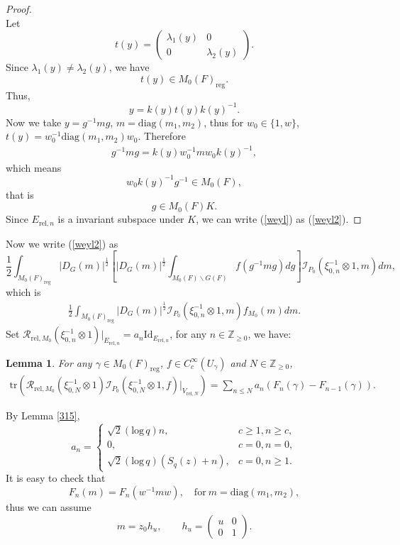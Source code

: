 \documentclass[11pt]{amsart}
\newtheorem {lemma}      [theorem]    {Lemma}
\renewcommand{\rm}{\mathrm}
\theoremstyle{definition}
\numberwithin{equation}{section}
\begin{document}
\begin{proof}
\[		\]
		Let
		\[
		t(y) = \begin{pmatrix} \lambda_1(y) & 0 \\ 0 & \lambda_2(y) \end{pmatrix}.
		\]
		Since \(\lambda_1(y) \neq \lambda_2(y)\), we have
		\[
		t(y) \in M_0(F)_{\mathrm{reg}}.
		\]
		Thus,
		\[
		y = k(y) t(y) k(y)^{-1}.
		\]
		Now we take \(y=g^{-1}mg\), \(m=\rm{diag}(m_1,m_2)\), thus for \(w_0\in \{1,w\}\), \(t(y)=w_0^{-1}\rm{diag}(m_1,m_2)w_0\). Therefore 
		\begin{align*}
			g^{-1}mg=k(y)w_0^{-1}mw_0k(y)^{-1},
		\end{align*}
		which means \[w_0k(y)^{-1}g^{-1}\in M_0(F),\]that is \[g\in M_0(F)K.\]
		Since \(E_{\rm{rel},n}\) is a invariant subspace under \(K\), we can write (\ref{weyl}) as (\ref{weyl2}).
	\end{proof}
	Now we write (\ref{weyl2}) as 
	\[\frac{1}{2}\int_{M_0(F)_{\rm{reg}}}|D_G(m)|^{\frac{1}{2}}\left[|D_G(m)|^{\frac{1}{2}}\int_{M_0(F)\backslash G(F)}f(g^{-1}mg)dg \right]\mathscr{I}_{P_0}(\xi_{0,n}^{-1}\otimes 1,m) dm,\]which is 
	\begin{align}\label{inverse}
		\frac{1}{2}\int_{M_0(F)_{\rm{reg}}}|D_G(m)|^{\frac{1}{2}}\mathscr{I}_{P_0}(\xi_{0,n}^{-1}\otimes 1,m) f_{M_0}(m)dm.
	\end{align}
	Set \(\mathscr{R}_{\rm{rel},M_0}(\xi_{0,n}^{-1}\otimes 1)|_{E_{\rm{rel},n}}=a_n \rm{Id}_{E_{\rm{rel},n}}\), for any \(n\in\mathbb{Z}_{\ge0}\), we have:
	\begin{lemma}\label{318}
		For any \(\gamma\in M_0(F)_{\rm{reg}}\), \(f\in C_c^\infty(U_\gamma)\) and \(N\in\mathbb{Z}_{\ge0}\),
		\begin{align*}
			\rm{tr} ( \mathscr{R}_{\rm{rel},M_0}(\xi_{0,N}^{-1}\otimes 1) \mathscr{I}_{P_0}(\xi_{0,N}^{-1}\otimes 1,f)|_{V_{\rm{rel},N}} )=\sum_{n\le N}a_n(F_n(\gamma)-F_{n-1}(\gamma)).
		\end{align*}
	\end{lemma}
	By Lemma \ref{315}, \[a_n = \begin{cases}
		\sqrt{2}(\rm{log}\,q) n, & c \ge 1, n \ge c, \\
		0, & c = 0, n = 0, \\
		\sqrt{2}(\rm{log}\,q) \left( S_q(z) + n \right), & c = 0, n \ge 1.
	\end{cases}\]
	It is easy to check that \[F_n(m)=F_n(w^{-1}mw),\quad \text{for}\ m=\rm{diag}(m_1,m_2),\]thus we can assume \[m = z_0h_u, \qquad h_u = \begin{pmatrix} u & 0 \\ 0 & 1 \end{pmatrix}.\]
\end{document}
